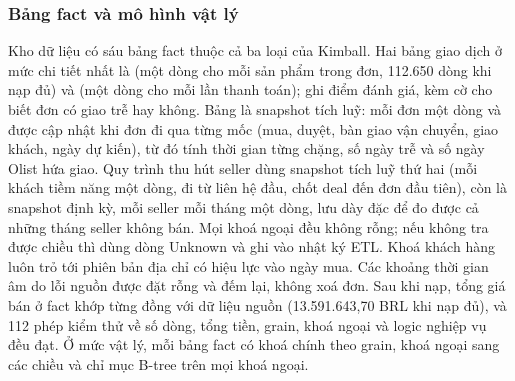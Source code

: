 \subsubsection*{Bảng fact và mô hình vật lý}
Kho dữ liệu có sáu bảng fact thuộc cả ba loại của Kimball. Hai bảng giao dịch ở mức chi tiết nhất là  (một dòng cho mỗi sản phẩm trong đơn, 112.650 dòng khi nạp đủ) và  (một dòng cho mỗi lần thanh toán);  ghi điểm đánh giá, kèm cờ cho biết đơn có giao trễ hay không. Bảng  là snapshot tích luỹ: mỗi đơn một dòng và được cập nhật khi đơn đi qua từng mốc (mua, duyệt, bàn giao vận chuyển, giao khách, ngày dự kiến), từ đó tính thời gian từng chặng, số ngày trễ và số ngày Olist hứa giao. Quy trình thu hút seller dùng snapshot tích luỹ thứ hai  (mỗi khách tiềm năng một dòng, đi từ liên hệ đầu, chốt deal đến đơn đầu tiên), còn  là snapshot định kỳ, mỗi seller mỗi tháng một dòng, lưu dày đặc để đo được cả những tháng seller không bán. Mọi khoá ngoại đều không rỗng; nếu không tra được chiều thì dùng dòng Unknown và ghi vào nhật ký ETL. Khoá khách hàng luôn trỏ tới phiên bản địa chỉ có hiệu lực vào ngày mua. Các khoảng thời gian âm do lỗi nguồn được đặt rỗng và đếm lại, không xoá đơn. Sau khi nạp, tổng giá bán ở fact khớp từng đồng với dữ liệu nguồn (13.591.643,70 BRL khi nạp đủ), và 112 phép kiểm thử về số dòng, tổng tiền, grain, khoá ngoại và logic nghiệp vụ đều đạt. Ở mức vật lý, mỗi bảng fact có khoá chính theo grain, khoá ngoại sang các chiều và chỉ mục B-tree trên mọi khoá ngoại.


